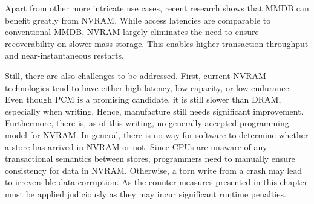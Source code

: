 Apart from other more intricate use cases, recent research shows that \ac{MMDB}
can benefit greatly from \ac{NVRAM}. While access latencies are comparable to
conventional \ac{MMDB}, \ac{NVRAM} largely eliminates the need to ensure
recoverability on slower mass storage. This enables higher transaction
throughput and near-instantaneous restarts.

Still, there are also challenges to be addressed. First, current \ac{NVRAM}
technologies tend to have either high latency, low capacity, or low endurance.
Even though \ac{PCM} is a promising candidate, it is still slower than
\ac{DRAM}, especially when writing. Hence, manufacture still needs significant
improvement. Furthermore, there is, as of this writing, no generally accepted
programming model for \ac{NVRAM}. In general, there is no way for software to
determine whether a store has arrived in \ac{NVRAM} or not. Since \ac{CPU}s are
unaware of any transactional semantics between stores, programmers need to
manually ensure consistency for data in \ac{NVRAM}. Otherwise, a torn write from
a crash may lead to irreversible data corruption. As the counter measures
presented in this chapter must be applied judiciously as they may incur
significant runtime penalties.
